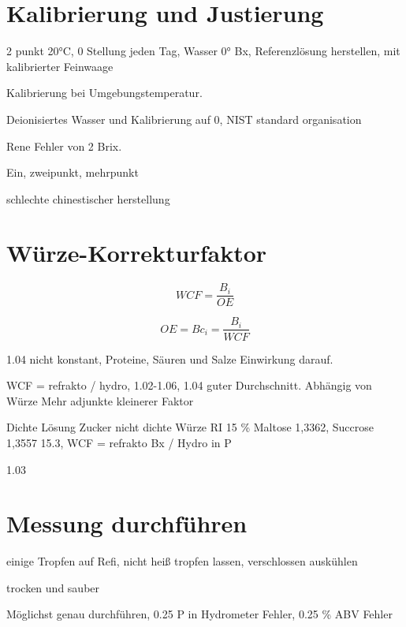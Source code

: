 \documentclass[a4paper,parskip=half]{scrartcl}
\newcommand{\bxi}{\mathit{B}_i}
\newcommand{\bxic}{\mathit{Bc}_i}
\newcommand{\oex}{\mathit{OE}}
\newcommand{\wcf}{\mathit{WCF}}
\begin{document}
\section*{Kalibrierung und Justierung}

2 punkt 20°C, 0 Stellung jeden Tag, Wasser 0° Bx, Referenzlösung herstellen,
mit kalibrierter Feinwaage
\autocite{Terrill2013}

Kalibrierung bei Umgebungstemperatur.
\autocite{Bonham2001}

Deionisiertes Wasser und Kalibrierung auf 0, NIST standard
organisation
\autocite{Depalma2017}

Rene Fehler von 2 Brix.

Ein, zweipunkt, mehrpunkt
\autocite{Earl2015}

schlechte chinestischer herstellung
\autocite{Troester2012}

\section*{Würze-Korrekturfaktor}

\begin{equation}
\wcf = \frac{\bxi}{\mathit{OE}}
\end{equation}

\begin{equation}
\oex = \bxic = \frac{\bxi}{\wcf}
\end{equation}

1.04 nicht konstant, Proteine, Säuren und Salze Einwirkung
darauf.
\autocite{Roberts1950}

WCF = refrakto / hydro, 1.02-1.06, 1.04 guter Durchschnitt. Abhängig von Würze
Mehr adjunkte kleinerer Faktor
\autocite{Terrill2013}

Dichte Lösung Zucker nicht dichte Würze
RI 15 \% Maltose 1,3362, Succrose 1,3557 15.3, 
WCF = refrakto Bx  / Hydro in P
\autocite{Bonham2001}

\autocite{Weiss2016} 1.03

\section*{Messung durchführen}

einige Tropfen auf Refi, nicht heiß tropfen lassen, verschlossen auskühlen
\autocite{Terrill2013}

trocken und sauber
\autocite{Bonham2001}

Möglichst genau durchführen, 0.25 P in Hydrometer Fehler,
0.25 \% ABV Fehler
\autocite{Bonham2001}
\end{document}
